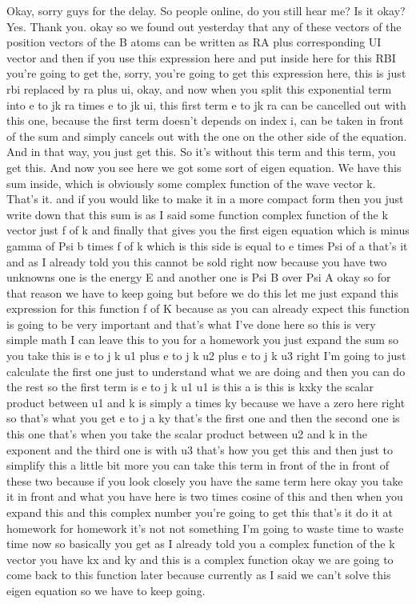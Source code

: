 Okay, sorry guys for the delay. So people online, do you still hear me? Is it okay? Yes. Thank you. okay so we found out yesterday that any of these vectors of the position vectors of the B atoms can be written as RA plus corresponding UI vector and then if you use this expression here and put inside here for this RBI you're going to get the, sorry, you're going to get this expression here, this is just rbi replaced by ra plus ui, okay, and now when you split this exponential term into e to jk ra times e to jk ui, this first term e to jk ra can be cancelled out with this one, because the first term doesn't depends on index i, can be taken in front of the sum and simply cancels out with the one on the other side of the equation. And in that way, you just get this. So it's without this term and this term, you get this. And now you see here we got some sort of eigen equation. We have this sum inside, which is obviously some complex function of the wave vector k. That's it. and if you would like to make it in a more compact form then you just write down that this sum is as I said some function complex function of the k vector just f of k and finally that gives you the first eigen equation which is minus gamma of Psi b times f of k which is this side is equal to e times Psi of a that's it and as I already told you this cannot be sold right now because you have two unknowns one is the energy E and another one is Psi B over Psi A okay so for that reason we have to keep going but before we do this let me just expand this expression for this function f of K because as you can already expect this function is going to be very important and that's what I've done here so this is very simple math I can leave this to you for a homework you just expand the sum so you take this is e to j k u1 plus e to j k u2 plus e to j k u3 right I'm going to just calculate the first one just to understand what we are doing and then you can do the rest so the first term is e to j k u1 u1 is this a is this is kxky the scalar product between u1 and k is simply a times ky because we have a zero here right so that's what you get e to j a ky that's the first one and then the second one is this one that's when you take the scalar product between u2 and k in the exponent and the third one is with u3 that's how you get this and then just to simplify this a little bit more you can take this term in front of the in front of these two because if you look closely you have the same term here okay you take it in front and what you have here is two times cosine of this and then when you expand this and this complex number you're going to get this that's it do it at homework for homework it's not not something I'm going to waste time to waste time now so basically you get as I already told you a complex function of the k vector you have kx and ky and this is a complex function okay we are going to come back to this function later because currently as I said we can't solve this eigen equation so we have to keep going.